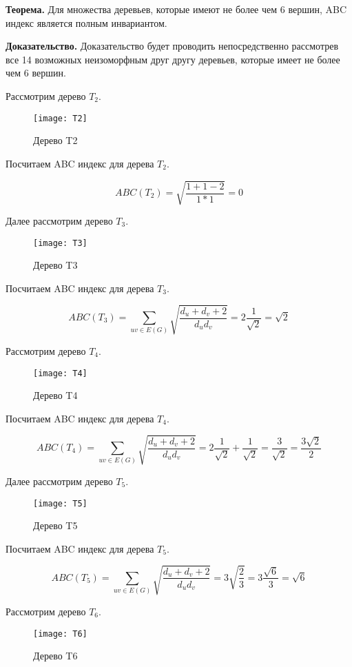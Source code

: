 \documentclass{article}
\begin{document}
\textbf{Теорема.} Для множества деревьев, которые имеют не более чем 6 вершин, ABC индекс является полным инвариантом.


\textbf{Доказательство.}
Доказательство будет проводить непосредственно рассмотрев все 14 возможных неизоморфным друг другу деревьев, которые имеет не более чем 6 вершин.

Рассмотрим дерево $T_2$.

\begin{figure}[h]
\texttt{[image: T2]}
\centering
\caption{Дерево T2}
\end{figure}

Посчитаем ABC индекс для дерева $T_2$.

$$ ABC(T_2) = \sqrt{\frac{1 + 1  - 2} {1 * 1}} = 0 $$

Далее рассмотрим дерево $T_3$.

\begin{figure}[h]
\texttt{[image: T3]}
\centering
\caption{Дерево T3}
\end{figure}

Посчитаем ABC индекс для дерева $T_3$.

$$ ABC(T_3) = \sum_{uv \in E(G)} \sqrt{\frac{d_u + d_v + 2}{d_u d_v}} =  2 \frac{1}{\sqrt{2}} = \sqrt{2} $$


Рассмотрим дерево $T_4$.

\begin{figure}[h]
\texttt{[image: T4]}
\centering
\caption{Дерево T4}
\end{figure}

Посчитаем ABC индекс для дерева $T_4$.

$$ ABC(T_4) = \sum_{uv \in E(G)} \sqrt{\frac{d_u + d_v + 2}{d_u d_v}} =  2 \frac{1}{\sqrt{2}} + \frac{1}{\sqrt{2}} = \frac{3}{\sqrt{2}}
= \frac{3 \sqrt{2}}{2} $$


Далее рассмотрим дерево $T_5$.

\begin{figure}[h]
\texttt{[image: T5]}
\centering
\caption{Дерево T5}
\end{figure}

Посчитаем ABC индекс для дерева $T_5$.

$$ ABC(T_5) = \sum_{uv \in E(G)} \sqrt{\frac{d_u + d_v + 2}{d_u d_v}} = 3 \sqrt{\frac{2}{3}} = 3\frac{\sqrt{6}}{3} = \sqrt{6} $$

Рассмотрим дерево $T_6$.

\begin{figure}[h]
\texttt{[image: T6]}
\centering
\caption{Дерево T6}
\end{figure}
\end{document}
